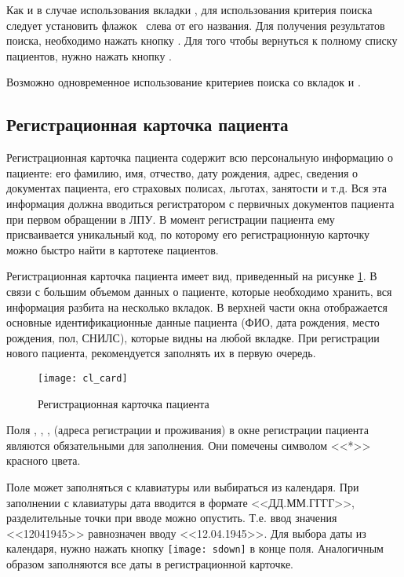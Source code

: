 Как и в случае использования вкладки , для использования критерия поиска следует установить флажок \putx~слева от его названия. Для получения результатов поиска, необходимо нажать кнопку . Для того чтобы вернуться к полному списку пациентов, нужно нажать кнопку  .

Возможно одновременное использование критериев поиска со вкладок  и .

\subsection{Регистрационная карточка пациента} \label{cl_card}

Регистрационная карточка пациента содержит всю персональную информацию о пациенте: его фамилию, имя, отчество, дату рождения, адрес, сведения о документах пациента, его страховых полисах, льготах, занятости и т.д. Вся эта информация должна вводиться регистратором с первичных документов пациента при первом обращении в ЛПУ. В момент регистрации пациента ему присваивается уникальный код, по которому его регистрационную карточку можно быстро найти в картотеке пациентов.

Регистрационная карточка пациента имеет вид, приведенный на рисунке \ref{img_cl_card}. В связи с большим объемом данных о пациенте, которые необходимо хранить, вся информация разбита на несколько вкладок. В верхней части окна отображается основные идентификационные данные пациента (ФИО, дата рождения, место рождения, пол, СНИЛС), которые видны на любой вкладке. При регистрации нового пациента, рекомендуется заполнять их в первую очередь.

\begin{figure}[ht]\centering
 \texttt{[image: cl\_card]}
 \caption{Регистрационная карточка пациента}
 \label{img_cl_card}
\end{figure} 

Поля , , ,  (адреса регистрации и проживания) в окне регистрации пациента являются обязательными для заполнения. Они помечены символом <<*>> красного цвета.

Поле  может заполняться с клавиатуры или выбираться из календаря. При заполнении с клавиатуры дата вводится в формате <<ДД.ММ.ГГГГ>>, разделительные точки при вводе можно опустить. Т.е. ввод значения <<12041945>> равнозначен вводу <<12.04.1945>>. Для выбора даты из календаря, нужно нажать кнопку \texttt{[image: sdown]}  в конце поля. Аналогичным образом заполняются все даты в регистрационной карточке.

